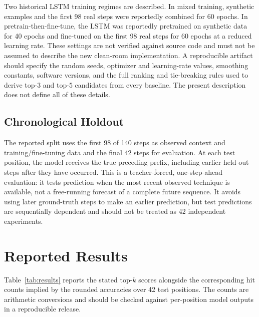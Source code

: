 \documentclass[conference]{IEEEtran}
\begin{document}
Two historical LSTM training regimes are described. In mixed training, synthetic examples and the first 98 real steps were reportedly combined for 60 epochs. In pretrain-then-fine-tune, the LSTM was reportedly pretrained on synthetic data for 40 epochs and fine-tuned on the first 98 real steps for 60 epochs at a reduced learning rate. These settings are not verified against source code and must not be assumed to describe the new clean-room implementation. A reproducible artifact should specify the random seeds, optimizer and learning-rate values, smoothing constants, software versions, and the full ranking and tie-breaking rules used to derive top-$3$ and top-$5$ candidates from every baseline. The present description does not define all of these details.

\subsection{Chronological Holdout}
The reported split uses the first 98 of 140 steps as observed context and training/fine-tuning data and the final 42 steps for evaluation. At each test position, the model receives the true preceding prefix, including earlier held-out steps after they have occurred. This is a teacher-forced, one-step-ahead evaluation: it tests prediction when the most recent observed technique is available, not a free-running forecast of a complete future sequence. It avoids using later ground-truth steps to make an earlier prediction, but test predictions are sequentially dependent and should not be treated as 42 independent experiments.

\section{Reported Results}
Table~\ref{tab:results} reports the stated top-$k$ scores alongside the corresponding hit counts implied by the rounded accuracies over 42 test positions. The counts are arithmetic conversions and should be checked against per-position model outputs in a reproducible release.
\end{document}
